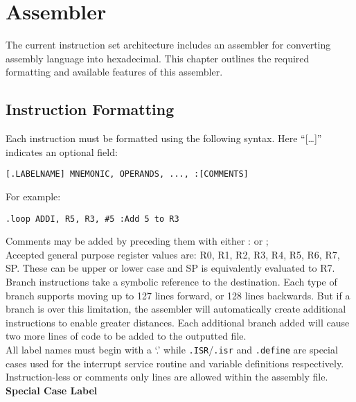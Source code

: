 
\section{Assembler}
The current instruction set architecture includes an assembler for converting assembly language into hexadecimal. 
This chapter outlines the required formatting and available features of this assembler. 

\subsection{Instruction Formatting}
Each instruction must be formatted using the following syntax. 
Here ``[\dots]'' indicates an optional field:

\begin{center}\texttt{[.LABELNAME] MNEMONIC, OPERANDS, ..., :[COMMENTS]}\end{center}
For example:
\begin{center}\texttt{.loop ADDI, R5, R3, \#5 :Add 5 to R3}
\end{center}

 Comments may be added by preceding them with either : or ;\\

 Accepted general purpose register values are: R0, R1, R2, R3, R4, R5, R6, R7, SP. These can be upper or lower case and SP is equivalently evaluated to R7.\\

 Branch instructions take a symbolic reference to the destination. 
Each type of branch supports moving up to 127 lines forward, or 128 lines backwards. But if a branch is over this limitation, the assembler will automatically create additional instructions to enable greater distances. Each additional branch added will cause two more lines of code to be added to the outputted file. \\

 All label names must begin with a `.' while \texttt{.ISR}/\texttt{.isr} and \texttt{.define} are special cases used for the interrupt service routine and variable definitions respectively. \\

 Instruction-less or comments only lines are allowed within the assembly file. \\
\newpage
 {\bf Special Case Label}

